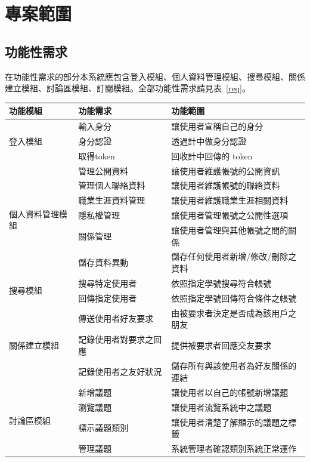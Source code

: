 \documentclass[11pt]{article}
\begin{document}
\section{專案範圍}

\subsection{功能性需求}
在功能性需求的部分本系統應包含登入模組、個人資料管理模組、搜尋模組、關係建立模組、討論區模組、訂閱模組。全部功能性需求請見表~\ref{req}。

\begin{table}[t]
\centering
\begin{tabular}{ | l | l | l | }
\hline
功能模組 & 功能需求 & 功能範圍 \\ \hline \hline
\multirow{3}{*}{登入模組}
& 輸入身分 & 讓使用者宣稱自己的身分\\
& 身分認證 & 透過計中做身分認證 \\
& 取得token & 回收計中回傳的 token \\ \hline
\multirow{6}{*}{個人資料管理模組}
& 管理公開資料 & 讓使用者維護帳號的公開資訊 \\
& 管理個人聯絡資料& 讓使用者維護帳號的聯絡資料\\
& 職業生涯資料管理& 讓使用者維護職業生涯相關資料 \\
& 隱私權管理& 讓使用者管理帳號之公開性選項 \\
& 關係管理& 讓使用者管理與其他帳號之間的關係 \\
& 儲存資料異動& 儲存任何使用者新增/修改/刪除之資料 \\ \hline
\multirow{2}{*}{搜尋模組}
& 搜尋特定使用者 & 依照指定學號搜尋符合帳號 \\
& 回傳指定使用者 & 依照指定學號回傳符合條件之帳號 \\ \hline
 \multirow{3}{*}{關係建立模組}
& 傳送使用者好友要求 & 由被要求者決定是否成為該用戶之朋友 \\
& 記錄使用者對要求之回應 & 提供被要求者回應交友要求 \\
& 記錄使用者之友好狀況 & 儲存所有與該使用者為好友關係的連結 \\ \hline
\multirow{4}{*}{討論區模組}
& 新增議題 & 讓使用者以自己的帳號新增議題 \\
& 瀏覽議題 & 讓使用者流覽系統中之議題 \\
& 標示議題類別 & 讓使用者清楚了解顯示的議題之標籤 \\
& 管理議題 & 系統管理者確認類別系統正常運作 \\ \hline

\end{tabular}
\end{table}
\end{document}
